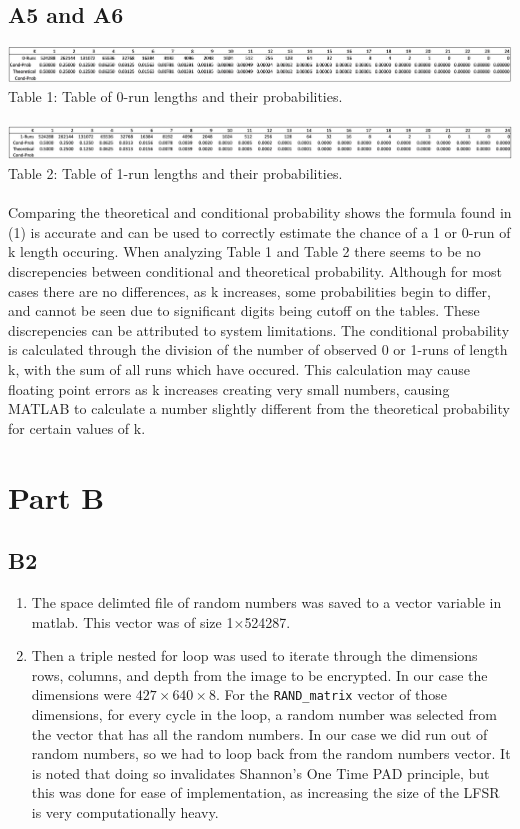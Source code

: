 \documentclass[12pt, letterpaper, titlepage, hidelinks]{article}
\begin{document}
	\subsection{A5 and A6}
		\includegraphics[width=\textwidth]{0_run_table}
		Table 1: Table of 0-run lengths and their probabilities.
		\\ \\
		\includegraphics[width=\textwidth]{1_run_table}
		Table 2: Table of 1-run lengths and their probabilities. \\ \\
		Comparing the theoretical and conditional probability shows the formula found in (1) is accurate and can be used to correctly estimate the chance of a 1 or 0-run of k length occuring. When analyzing Table 1 and Table 2 there seems to be no discrepencies between conditional and theoretical probability. Although for most cases there are no differences, as k increases, some probabilities begin to differ, and cannot be seen due to significant digits being cutoff on the tables. These discrepencies can be attributed to system limitations. The conditional probability is calculated through the division of the number of observed 0 or 1-runs of length k, with the sum of all runs which have occured. This calculation may cause floating point errors as k increases creating very small numbers, causing MATLAB to calculate a number slightly different from the theoretical probability for certain values of k.
\section{Part B}
		\subsection{B2}
			\begin{enumerate}
				\item The space delimted file of random numbers was saved to a vector variable in matlab. This vector was of size 1$\times$524287.
				\item Then a triple nested for loop was used to iterate through the dimensions rows, columns, and depth from the image to be encrypted. In our case the dimensions were $427\times640\times8$. For the \verb|RAND_matrix| vector of those dimensions, for every cycle in the loop, a random number was selected from the vector that has all the random numbers. In our case we did run out of random numbers, so we had to loop back from the random numbers vector. It is noted that doing so invalidates Shannon's One Time PAD principle, but this was done for ease of implementation, as increasing the size of the LFSR is very computationally heavy.
			\end{enumerate}
\end{document}
